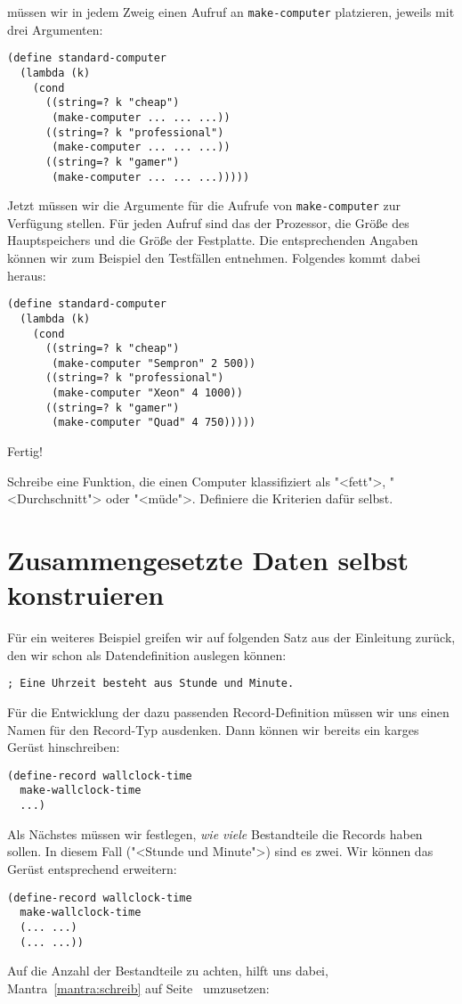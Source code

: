 müssen wir in jedem Zweig einen Aufruf an \lstinline{make-computer}
platzieren, jeweils mit drei Argumenten:
%
\begin{lstlisting}
(define standard-computer
  (lambda (k)
    (cond
      ((string=? k "cheap")
       (make-computer ... ... ...))
      ((string=? k "professional")
       (make-computer ... ... ...))
      ((string=? k "gamer")
       (make-computer ... ... ...)))))
\end{lstlisting}
%
Jetzt müssen wir die Argumente für die Aufrufe von
\lstinline{make-computer} zur Verfügung stellen.  Für jeden Aufruf sind
das der Prozessor, die Größe des Hauptspeichers und die
Größe der Festplatte.  Die entsprechenden Angaben können wir zum
Beispiel den Testfällen entnehmen.  Folgendes kommt dabei heraus:
%
\begin{lstlisting}
(define standard-computer
  (lambda (k)
    (cond
      ((string=? k "cheap")
       (make-computer "Sempron" 2 500))
      ((string=? k "professional")
       (make-computer "Xeon" 4 1000))
      ((string=? k "gamer")
       (make-computer "Quad" 4 750)))))
\end{lstlisting}
%
Fertig!

\begin{aufgabeinline}
  Schreibe eine Funktion, die einen Computer klassifiziert als
  "<fett">, "<Durchschnitt"> oder "<müde">.  Definiere die Kriterien
  dafür selbst.
\end{aufgabeinline}

\section{Zusammengesetzte Daten selbst konstruieren}

Für ein weiteres Beispiel greifen wir auf folgenden Satz aus der
Einleitung zurück, den wir schon als Datendefinition auslegen können:
%
\begin{lstlisting}
; Eine Uhrzeit besteht aus Stunde und Minute.
\end{lstlisting}
%
Für die Entwicklung der dazu passenden Record-Definition müssen wir
uns einen Namen für den Record-Typ ausdenken.  Dann können wir bereits
ein karges Gerüst hinschreiben:
%
\begin{lstlisting}
(define-record wallclock-time
  make-wallclock-time
  ...)
\end{lstlisting}
%
Als Nächstes müssen wir festlegen, \emph{wie viele} Bestandteile die
Records haben sollen.  In diesem Fall ("<Stunde und Minute">) sind es
zwei.  Wir können das Gerüst entsprechend erweitern:
%
\begin{lstlisting}
(define-record wallclock-time
  make-wallclock-time
  (... ...)
  (... ...))
\end{lstlisting}
%
Auf die Anzahl der Bestandteile zu achten, hilft uns dabei, 
Mantra~\ref{mantra:schreib} auf Seite~\pageref{mantra:schreib}
umzusetzen:

